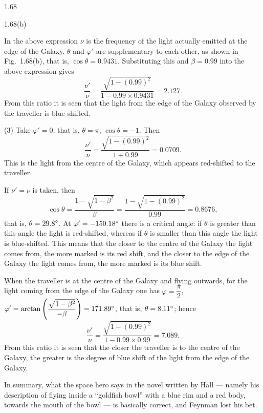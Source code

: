 \begin{solution}{1.68}
\begin{figbox}{1.68(b)}
\end{figbox}

In the above expression $\nu$ is the frequency of the light actually emitted at the edge of the Galaxy. $\theta$ and $\varphi'$ are supplementary to each other, as shown in Fig.~1.68(b), that is, $\cos\theta=0.9431$. Substituting this and $\beta=0.99$ into the above expression gives
\[
\frac{\nu'}{\nu}=\frac{\sqrt{1-(0.99)^2}}{1-0.99\times0.9431}=2.127.
\]
From this ratio it is seen that the light from the edge of the Galaxy observed by the traveller is blue-shifted.

(3) Take $\varphi'=0$, that is, $\theta=\pi$, $\cos\theta=-1$. Then
\[
\frac{\nu'}{\nu}=\frac{\sqrt{1-(0.99)^2}}{1+0.99}=0.0709.
\]
This is the light from the centre of the Galaxy, which appears red-shifted to the traveller.

If $\nu'=\nu$ is taken, then
\[
\cos\theta=\frac{1-\sqrt{1-\beta^2}}{\beta}=\frac{1-\sqrt{1-(0.99)^2}}{0.99}=0.8676,
\]
that is, $\theta=29.8^{\circ}$. At $\varphi'=-150.18^{\circ}$ there is a critical angle: if $\theta$ is greater than this angle the light is red-shifted, whereas if $\theta$ is smaller than this angle the light is blue-shifted. This means that the closer to the centre of the Galaxy the light comes from, the more marked is its red shift, and the closer to the edge of the Galaxy the light comes from, the more marked is its blue shift.

When the traveller is at the centre of the Galaxy and flying outwards, for the light coming from the edge of the Galaxy one has $\varphi=\dfrac{\pi}{2}$, $\varphi'=\arctan\left(\dfrac{\sqrt{1-\beta^2}}{-\beta}\right)=171.89^{\circ}$, that is, $\theta=8.11^{\circ}$; hence
\[
\frac{\nu'}{\nu}=\frac{\sqrt{1-(0.99)^2}}{1-0.99\times0.99}=7.089.
\]
From this ratio it is seen that the closer the traveller is to the centre of the Galaxy, the greater is the degree of blue shift of the light from the edge of the Galaxy.

In summary, what the space hero says in the novel written by Hall --- namely his description of flying inside a ``goldfish bowl'' with a blue rim and a red body, towards the mouth of the bowl --- is basically correct, and Feynman lost his bet.
\end{solution}

